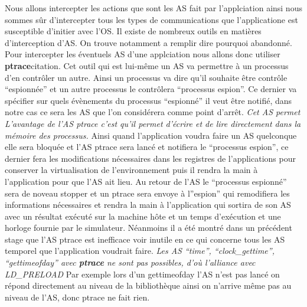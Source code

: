 Nous allons intercepter les actions que sont les AS fait par l'applciation ainsi
nous sommes sûr d'intercepter tous les types de communications que
l'applicatione est susceptible d'initier avec l'OS. Il existe de nombreux outils
en matières d'interception d'AS. On trouve notamment {\color{green} a remplir
  dire pourquoi abandonné}. Pour intercepter les éventuels AS d'une applciation
nous allons donc utiliser \textbf{ptrace}{\color{red}citation}. Cet outil qui
est lui-même un AS va permettre à un processus d'en contrôler un autre. Ainsi un
processus va dire qu'il souhaite être contrôle ``espionnée'' et un autre
processus le contrôlera ``processus espion''. Ce dernier va spécifier sur quels
évènements du processus ``espionné'' il veut être notifié, dans notre cas ce
sera les AS que l'on considérera comme point d'arrêt. \textit{Cet AS permet
  L'avantage de l'AS ptrace c'est qu'il permet d'écrire et de lire directement
  dans la mémoire des processus.} Ainsi quand l'application voudra faire un AS
quelconque elle sera bloquée et l'AS ptrace sera lancé et notifiera le
``processus espion'', ce dernier fera les modifications nécessaires dans les
registres de l'applications pour conserver la virtualisation de l'environnement
puis il rendra la main à l'application pour que l'AS ait lieu. Au retour de l'AS
le ``processus espionné'' sera de noveau stopper et un ptrace sera envoye à
l''espion'' qui remodifiera les informations nécessaires et rendra la main à
l'application qui sortira de son AS avec un résultat exécuté sur la machine hôte
et un temps d'exécution et une horloge fournie par le simulateur. Néanmoins il a
été montré dans un précédent stage que l'AS ptrace est inefficace voir inutile
en ce qui concerne tous les AS temporel que l'application voudrait
faire. \textit{Les AS ``time'', ``clock\_gettime'', ``gettimeofday'' avec
  \textbf{ptrace} ne sont pas possibles, d'où l'alliance avec LD\_PRELOAD} Par
exemple lors d'un gettimeofday l'AS n'est pas lancé on répond directement au
niveau de la bibliothèque ainsi on n'arrive même pas au niveau de l'AS, donc
ptrace ne fait rien. 

